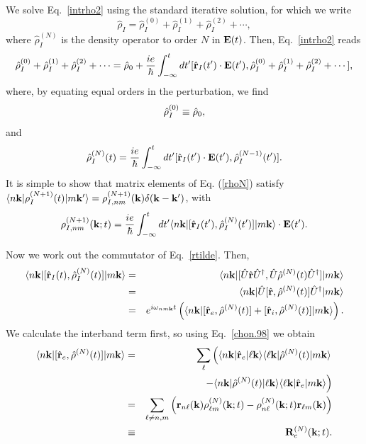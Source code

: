 \documentclass[floatfix,prb,aps,superscriptaddress,11pt,preprint]{revtex4}
\begin{document}
We solve Eq.~\eqref{intrho2} using the standard iterative
solution, for which we write
\begin{equation}\label{rhop}
\hat\rho_I=\hat\rho_I^{(0)}+\hat\rho_I^{(1)}+\hat\rho_I^{(2)}+\cdots
,
\end{equation}
where $\hat\rho_I^{(N)}$ is the density operator to order $N$ in $\mathbf{E}(t)$.
Then, Eq.~\eqref{intrho2} reads
\begin{equation}\label{intrho3}
\hat\rho_I^{(0)}+\hat\rho_I^{(1)}+\hat\rho_I^{(2)}+\cdots
=\hat{{\rho}}_0
+
\frac{ie}{\hbar}\int_{-\infty}^t dt'[\hat{\mathbf{r}}_I(t')\cdot\mathbf{E}(t'),
\hat\rho_I^{(0)}+\hat\rho_I^{(1)}+\hat\rho_I^{(2)}+\cdots
]
,
\end{equation}
where, by equating equal orders in the perturbation, we find
\begin{equation}\label{rho0}
\hat{{\rho}}_I^{(0)}\equiv\hat{{\rho}}_0
,
\end{equation}
and
\begin{equation}\label{rhoN}
\hat{{\rho}}_I^{(N)}(t)=
\frac{ie}{\hbar}
\int_{-\infty}^t dt'[\hat{\mathbf{r}}_I(t')\cdot\mathbf{E}(t'),\hat{{\rho}}^{(N-1)}_I(t')].
\end{equation}
It is simple to show that matrix elements of Eq. (\ref{rhoN}) satisfy
$\langle n\mathbf{k} |{\rho}_I^{(N+1)}(t)| m\mathbf{k}' \rangle={\rho}^{(N+1)}_{I,nm}(\mathbf{k})\delta(\mathbf{k}-\mathbf{k}')$,
with
\begin{equation}\label{rtilde}
{\rho}^{(N+1)}_{I,nm}(\mathbf{k};t)
=\frac{ie}{\hbar}\int_{-\infty}^t dt'
\langle n\mathbf{k} |
[\hat{\mathbf{r}}_I(t'),\hat{{\rho}}^{(N)}_I(t')]
| m\mathbf{k} \rangle
\cdot\mathbf{E}(t')
.
\end{equation}

Now we work out the commutator of Eq.~\eqref{rtilde}. Then,
\begin{eqnarray}\label{conmu1}
\langle n\mathbf{k} |
[\hat{\mathbf{r}}_I(t),\hat{{\rho}}^{(N)}_I(t)]
| m\mathbf{k} \rangle
&=&
\langle n\mathbf{k} |
[\hat{U}\hat{\mathbf{r}}\hat{U}^\dagger,\hat{U}\hat{{\rho}}^{(N)}(t)\hat{U}^\dagger]
| m\mathbf{k} \rangle
\nonumber \\
&=&
\langle n\mathbf{k} |
\hat{U}[\hat{\mathbf{r}},\hat{{\rho}}^{(N)}(t)]\hat{U}^\dagger
| m\mathbf{k} \rangle
\\
&=&
e^{i\omega_{nm\mathbf{k}}t}
\left(
\langle n\mathbf{k} |
[\hat{\mathbf{r}}_e,\hat{{\rho}}^{(N)}(t)]
+
[\hat{\mathbf{r}}_i,\hat{{\rho}}^{(N)}(t)]
| m\mathbf{k} \rangle
\right)
\nonumber
.
\end{eqnarray}
We calculate the interband term first, so using Eq.~\eqref{chon.98} we obtain
\begin{eqnarray}\label{conmu2}
\langle n\mathbf{k} |
[\hat{\mathbf{r}}_e,\hat{{\rho}}^{(N)}(t)]
| m\mathbf{k} \rangle
&=&
\sum_{\ell}
\left(
\langle n\mathbf{k} |
\hat{\mathbf{r}}_e
| \ell\mathbf{k} \rangle
\langle \ell\mathbf{k} |
\hat{{\rho}}^{(N)}(t)
| m\mathbf{k} \rangle
\right.
\nonumber \\
&&
\left.
-
\langle n\mathbf{k} |
\hat{{\rho}}^{(N)}(t)
| \ell\mathbf{k} \rangle
\langle \ell\mathbf{k} |
\hat{\mathbf{r}}_e
| m\mathbf{k} \rangle
\right)
\nonumber \\
&=&
\sum_{\ell\ne n,m}
\left(
\mathbf{r}_{n\ell}(\mathbf{k})
{\rho}^{(N)}_{\ell m}(\mathbf{k};t)
-
{\rho}^{(N)}_{n\ell}(\mathbf{k};t)
\mathbf{r}_{\ell m}(\mathbf{k})
\right)
\nonumber\\
&\equiv&
\mathbf{R}^{(N)}_e(\mathbf{k};t)
.
\end{eqnarray}
\end{document}
